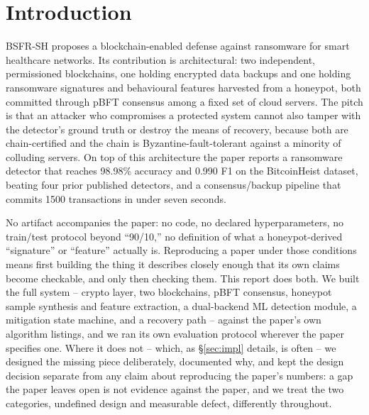 \documentclass[conference]{IEEEtran}
\begin{document}
\begin{abstract}
transfer evaluation against three real malware datasets, one of them genuinely dynamic. And a
\emph{scalability} analysis of on-chain storage growth and throughput. We further identify five
independent defects spanning the paper's evaluation methodology, security argument, and
preprocessing specification. The framework's central idea -- chain-protecting a detector's ground
truth and a system's backups from the same adversary -- is sound; several of the paper's
supporting claims measurably are not, and the extensions built here show that idea can be
attacked, and only partially defended even by mechanisms built specifically to close the gap, in
ways the paper's own security argument never considers.
\end{abstract}
\section{Introduction}

BSFR-SH \cite{wazid2023} proposes a blockchain-enabled defense against ransomware for smart
healthcare networks. Its contribution is architectural: two independent, permissioned
blockchains, one holding encrypted data backups and one holding ransomware signatures and
behavioural features harvested from a honeypot, both committed through pBFT consensus among a
fixed set of cloud servers. The pitch is that an attacker who compromises a protected system
cannot also tamper with the detector's ground truth or destroy the means of recovery, because
both are chain-certified and the chain is Byzantine-fault-tolerant against a minority of
colluding servers. On top of this architecture the paper reports a ransomware detector that
reaches 98.98\% accuracy and 0.990 F1 on the BitcoinHeist dataset, beating four prior published
detectors, and a consensus/backup pipeline that commits 1500 transactions in under seven
seconds.

No artifact accompanies the paper: no code, no declared hyperparameters, no train/test protocol
beyond ``90/10,'' no definition of what a honeypot-derived ``signature'' or ``feature'' actually
is. Reproducing a paper under those conditions means first building the thing it describes
closely enough that its own claims become checkable, and only then checking them. This report
does both. We built the full system -- crypto layer, two blockchains, pBFT consensus, honeypot
sample synthesis and feature extraction, a dual-backend ML detection module, a mitigation state
machine, and a recovery path -- against the paper's own algorithm listings, and we ran its own
evaluation protocol wherever the paper specifies one. Where it does not -- which, as
\S\ref{sec:impl} details, is often -- we designed the missing piece deliberately, documented why,
and kept the design decision separate from any claim about reproducing the paper's numbers: a
gap the paper leaves open is not evidence against the paper, and we treat the two categories,
undefined design and measurable defect, differently throughout.
\end{document}
